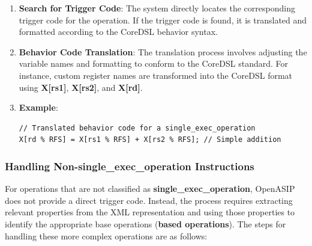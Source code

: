 \begin{enumerate}
    \item \textbf{Search for Trigger Code}: The system directly locates the corresponding trigger code for the operation. If the trigger code is found, it is translated and formatted according to the CoreDSL behavior syntax.

    \item \textbf{Behavior Code Translation}: The translation process involves adjusting the variable names and formatting to conform to the CoreDSL standard. For instance, custom register names are transformed into the CoreDSL format using \textbf{X[rs1]}, \textbf{X[rs2]}, and \textbf{X[rd]}.

    \item \textbf{Example}:
    \begin{lstlisting}
// Translated behavior code for a single_exec_operation
X[rd % RFS] = X[rs1 % RFS] + X[rs2 % RFS]; // Simple addition
    \end{lstlisting}
\end{enumerate}

\subsubsection{Handling \textbf{Non-single\_exec\_operation} Instructions}

For operations that are not classified as \textbf{single\_exec\_operation}, OpenASIP does not provide a direct trigger code. Instead, the process requires extracting relevant properties from the XML representation and using those properties to identify the appropriate base operations (\textbf{based operations}). The steps for handling these more complex operations are as follows:

